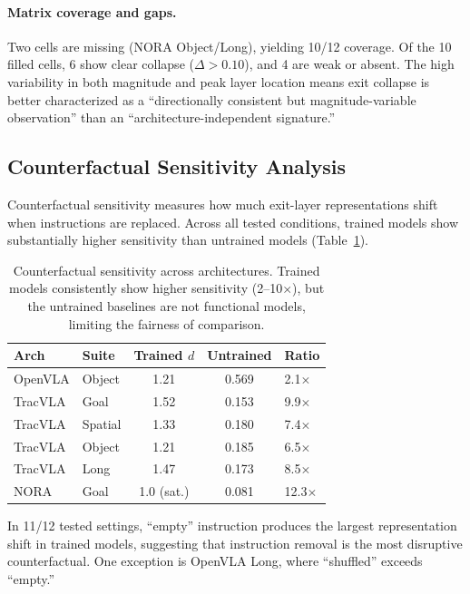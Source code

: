 \documentclass[letterpaper]{article}
\begin{document}
\paragraph{Matrix coverage and gaps.}
Two cells are missing (NORA Object/Long), yielding 10/12 coverage.
Of the 10 filled cells, 6 show clear collapse ($\Delta > 0.10$), and 4 are weak or absent.
The high variability in both magnitude and peak layer location means exit collapse is better characterized as a ``directionally consistent but magnitude-variable observation'' than an ``architecture-independent signature.''

\subsection{Counterfactual Sensitivity Analysis}
\label{sec:cf}

Counterfactual sensitivity measures how much exit-layer representations shift when instructions are replaced.
Across all tested conditions, trained models show substantially higher sensitivity than untrained models (Table~\ref{tab:cf}).

\begin{table}[t]
\centering
\caption{Counterfactual sensitivity across architectures. Trained models consistently show higher sensitivity (2--10$\times$), but the untrained baselines are not functional models, limiting the fairness of comparison.}
\label{tab:cf}
\small
\setlength{\tabcolsep}{3pt}
\begin{tabular}{llccl}
\toprule
\textbf{Arch} & \textbf{Suite} & \textbf{Trained $d$} & \textbf{Untrained} & \textbf{Ratio} \\
\midrule
OpenVLA & Object & 1.21 & 0.569 & 2.1$\times$ \\
TracVLA & Goal & 1.52 & 0.153 & 9.9$\times$ \\
TracVLA & Spatial & 1.33 & 0.180 & 7.4$\times$ \\
TracVLA & Object & 1.21 & 0.185 & 6.5$\times$ \\
TracVLA & Long & 1.47 & 0.173 & 8.5$\times$ \\
NORA & Goal & 1.0 (sat.) & 0.081 & 12.3$\times$ \\
\bottomrule
\end{tabular}
\end{table}

In 11/12 tested settings, ``empty'' instruction produces the largest representation shift in trained models, suggesting that instruction removal is the most disruptive counterfactual.
One exception is OpenVLA Long, where ``shuffled'' exceeds ``empty.''
\end{document}
